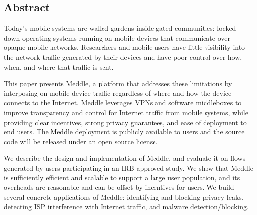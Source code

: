 \subsection*{Abstract}
Today's mobile systems are walled gardens inside gated communities:  locked-down 
operating systems running on mobile devices that communicate over opaque mobile 
networks. Researchers and mobile users have little visibility into the network 
traffic generated by their devices and have poor control over how, when, and where that traffic is sent.

This paper presents Meddle, a platform that addresses these limitations by interposing on mobile 
device traffic regardless of where and how the device connects to the Internet. Meddle leverages 
VPNs and software middleboxes to improve transparency and control 
for Internet traffic from mobile systems, while providing clear incentives, strong privacy guarantees, 
and ease of deployment to end users.  The Meddle deployment is publicly available to users and 
the source code will be released under an open source license.

We describe the design and implementation of Meddle, and evaluate it on flows generated by 
users participating in an IRB-approved study.  We show that Meddle is sufficiently efficient 
and scalable to support a large user population, and its overheads are reasonable and can be offset 
by incentives for users.  We build several concrete applications of Meddle: identifying and 
blocking privacy leaks, detecting ISP interference with Internet traffic, and malware detection/blocking.  







